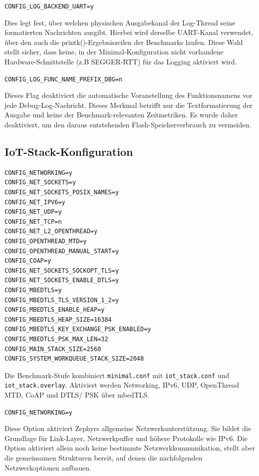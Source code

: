 \lstinline[style=codeinline]|CONFIG_LOG_BACKEND_UART=y|

Dies legt fest, {\"u}ber welchen physischen Ausgabekanal der Log-Thread seine formatierten Nachrichten ausgibt. Hierbei wird derselbe UART-Kanal verwendet, {\"u}ber den auch die printk()-Ergebniszeilen der Benchmarks laufen. Diese Wahl stellt sicher, dass keine, in der Minimal-Konfiguration nicht vorhandene Hardware-Schnittstelle (z.B SEGGER-RTT) f{\"u}r das Logging aktiviert wird.

\lstinline[style=codeinline]|CONFIG_LOG_FUNC_NAME_PREFIX_DBG=n|

Dieses Flag deaktiviert die automatische Voranstellung des Funktionsnamens vor jede Debug-Log-Nachricht. Dieses Merkmal betrifft nur die Textformatierung der Ausgabe und keine der Benchmark-relevanten Zeitmetriken. Es wurde daher deaktiviert, um den daraus entstehenden Flash-Speicherverbrauch zu vermeiden.

\subsection{IoT-Stack-Konfiguration}
\begin{lstlisting}[style=basecode,language=Kconfig]
CONFIG_NETWORKING=y
CONFIG_NET_SOCKETS=y
CONFIG_NET_SOCKETS_POSIX_NAMES=y
CONFIG_NET_IPV6=y
CONFIG_NET_UDP=y
CONFIG_NET_TCP=n
CONFIG_NET_L2_OPENTHREAD=y
CONFIG_OPENTHREAD_MTD=y
CONFIG_OPENTHREAD_MANUAL_START=y
CONFIG_COAP=y
CONFIG_NET_SOCKETS_SOCKOPT_TLS=y
CONFIG_NET_SOCKETS_ENABLE_DTLS=y
CONFIG_MBEDTLS=y
CONFIG_MBEDTLS_TLS_VERSION_1_2=y
CONFIG_MBEDTLS_ENABLE_HEAP=y
CONFIG_MBEDTLS_HEAP_SIZE=16384
CONFIG_MBEDTLS_KEY_EXCHANGE_PSK_ENABLED=y
CONFIG_MBEDTLS_PSK_MAX_LEN=32
CONFIG_MAIN_STACK_SIZE=2560
CONFIG_SYSTEM_WORKQUEUE_STACK_SIZE=2048
\end{lstlisting}
Die Benchmark-Stufe kombiniert \lstinline[style=codeinline]|minimal.conf| mit \lstinline[style=codeinline]|iot_stack.conf| und \lstinline[style=codeinline]|iot_stack.overlay|. Aktiviert werden Networking, IPv6, UDP, OpenThread MTD, CoAP und DTLS/ PSK {\"u}ber mbedTLS.

\lstinline[style=codeinline]|CONFIG_NETWORKING=y|

Diese Option aktiviert Zephyrs allgemeine Netzwerkunterst{\"u}tzung. Sie bildet die Grundlage f{\"u}r Link-Layer, Netzwerkpuffer und h{\"o}here Protokolle wie IPv6. Die Option aktiviert allein noch keine bestimmte Netzwerkkommunikation, stellt aber die gemeinsamen Strukturen bereit, auf denen die nachfolgenden Netzwerkoptionen aufbauen.

